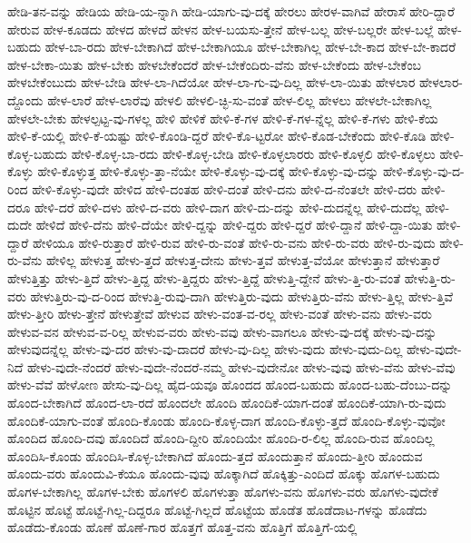 {ಹೇಡಿ-ತನ-ವನ್ನು
ಹೇಡಿಯ
ಹೇಡಿ-ಯ-ನ್ನಾಗಿ
ಹೇಡಿ-ಯಾಗು-ವು-ದಕ್ಕೆ
ಹೇರಲು
ಹೇರಳ-ವಾಗಿವೆ
ಹೇರಾಸೆ
ಹೇರಿ-ದ್ದಾರೆ
ಹೇರುವ
ಹೇಳ-ಕೂಡದು
ಹೇಳದ
ಹೇಳದೆ
ಹೇಳನ
ಹೇಳ-ಬಯಸು-ತ್ತೇನೆ
ಹೇಳ-ಬಲ್ಲ
ಹೇಳ-ಬಲ್ಲರೇ
ಹೇಳ-ಬಲ್ಲೆ
ಹೇಳ-ಬಹುದು
ಹೇಳ-ಬಾ-ರದು
ಹೇಳ-ಬೇಕಾಗಿದೆ
ಹೇಳ-ಬೇಕಾಗಿಯೂ
ಹೇಳ-ಬೇಕಾಗಿಲ್ಲ
ಹೇಳ-ಬೇ-ಕಾದ
ಹೇಳ-ಬೇ-ಕಾದರೆ
ಹೇಳ-ಬೇಕಾ-ಯಿತು
ಹೇಳ-ಬೇಕು
ಹೇಳಬೇಕೆಂದರೆ
ಹೇಳ-ಬೇಕೆಂದಿರು-ವೆನು
ಹೇಳ-ಬೇಕೆಂದು
ಹೇಳ-ಬೇಕೆಂಬ
ಹೇಳಬೇಕೆಂಬುದು
ಹೇಳ-ಬೇಡಿ
ಹೇಳ-ಲಾ-ಗಿದೆಯೋ
ಹೇಳ-ಲಾ-ಗು-ವು-ದಿಲ್ಲ
ಹೇಳ-ಲಾ-ಯಿತು
ಹೇಳಲಾರ
ಹೇಳಲಾರ-ದ್ದೊಂದು
ಹೇಳ-ಲಾರೆ
ಹೇಳ-ಲಾರೆವು
ಹೇಳಲಿ
ಹೇಳಲಿ-ಚ್ಛಿ-ಸು-ವಂತೆ
ಹೇಳ-ಲಿಲ್ಲ
ಹೇಳಲು
ಹೇಳಲೇ-ಬೇಕಾಗಿಲ್ಲ
ಹೇಳಲೇ-ಬೇಕು
ಹೇಳಲ್ಪಟ್ಟ-ವು-ಗಳಲ್ಲ
ಹೇಳಿ
ಹೇಳಿಕೆ
ಹೇಳಿ-ಕೆ-ಗಳ
ಹೇಳಿ-ಕೆ-ಗಳ-ನ್ನೆಲ್ಲ
ಹೇಳಿ-ಕೆ-ಗಳು
ಹೇಳಿ-ಕೆಯ
ಹೇಳಿ-ಕೆ-ಯಲ್ಲಿ
ಹೇಳಿ-ಕೆ-ಯಷ್ಟು
ಹೇಳಿ-ಕೊಂಡಿ-ದ್ದರೆ
ಹೇಳಿ-ಕೊ-ಟ್ಟರೋ
ಹೇಳಿ-ಕೊಡ-ಬೇಕೆಂದು
ಹೇಳಿ-ಕೊಡಿ
ಹೇಳಿ-ಕೊಳ್ಳ-ಬಹುದು
ಹೇಳಿ-ಕೊಳ್ಳ-ಬಾ-ರದು
ಹೇಳಿ-ಕೊಳ್ಳ-ಬೇಡಿ
ಹೇಳಿ-ಕೊಳ್ಳಲಾರರು
ಹೇಳಿ-ಕೊಳ್ಳಲಿ
ಹೇಳಿ-ಕೊಳ್ಳಲು
ಹೇಳಿ-ಕೊಳ್ಳು
ಹೇಳಿ-ಕೊಳ್ಳುತ್ತ
ಹೇಳಿ-ಕೊಳ್ಳು-ತ್ತಾ-ನೆಯೇ
ಹೇಳಿ-ಕೊಳ್ಳು-ವು-ದಕ್ಕೆ
ಹೇಳಿ-ಕೊಳ್ಳು-ವು-ದನ್ನು
ಹೇಳಿ-ಕೊಳ್ಳು-ವು-ದ-ರಿಂದ
ಹೇಳಿ-ಕೊಳ್ಳು-ವುದೇ
ಹೇಳಿದ
ಹೇಳಿ-ದಂತಹ
ಹೇಳಿ-ದಂತೆ
ಹೇಳಿ-ದನು
ಹೇಳಿ-ದ-ನೆಂತಲೇ
ಹೇಳಿ-ದರು
ಹೇಳಿ-ದರೂ
ಹೇಳಿ-ದರೆ
ಹೇಳಿ-ದಳು
ಹೇಳಿ-ದ-ವರು
ಹೇಳಿ-ದಾಗ
ಹೇಳಿ-ದು-ದನ್ನು
ಹೇಳಿ-ದುದನ್ನೆಲ್ಲ
ಹೇಳಿ-ದುದೆಲ್ಲ
ಹೇಳಿ-ದುದೇ
ಹೇಳಿದೆ
ಹೇಳಿ-ದೆನು
ಹೇಳಿ-ದೆಯೇ
ಹೇಳಿ-ದ್ದನ್ನು
ಹೇಳಿ-ದ್ದರು
ಹೇಳಿ-ದ್ದರೆ
ಹೇಳಿ-ದ್ದಾನೆ
ಹೇಳಿ-ದ್ದಾ-ಯಿತು
ಹೇಳಿ-ದ್ದಾರೆ
ಹೇಳಿಯೂ
ಹೇಳಿ-ರುತ್ತಾರೆ
ಹೇಳಿ-ರುವ
ಹೇಳಿ-ರು-ವಂತೆ
ಹೇಳಿ-ರು-ವನು
ಹೇಳಿ-ರು-ವರು
ಹೇಳಿ-ರು-ವುದು
ಹೇಳಿ-ರು-ವೆನು
ಹೇಳಿಲ್ಲ
ಹೇಳುತ್ತ
ಹೇಳು-ತ್ತದೆ
ಹೇಳುತ್ತ-ದೇನು
ಹೇಳು-ತ್ತವೆ
ಹೇಳುತ್ತ-ವೆಯೋ
ಹೇಳುತ್ತಾನೆ
ಹೇಳುತ್ತಾರೆ
ಹೇಳುತ್ತಿತ್ತು
ಹೇಳು-ತ್ತಿದೆ
ಹೇಳು-ತ್ತಿದ್ದ
ಹೇಳು-ತ್ತಿದ್ದರು
ಹೇಳು-ತ್ತಿದ್ದೆ
ಹೇಳುತ್ತಿ-ದ್ದೇನೆ
ಹೇಳು-ತ್ತಿ-ರು-ವಂತೆ
ಹೇಳುತ್ತಿ-ರು-ವರು
ಹೇಳುತ್ತಿರು-ವು-ದ-ರಿಂದ
ಹೇಳುತ್ತಿ-ರುವು-ದಾಗಿ
ಹೇಳುತ್ತಿರು-ವುದು
ಹೇಳುತ್ತಿರು-ವೆನು
ಹೇಳು-ತ್ತಿಲ್ಲ
ಹೇಳು-ತ್ತಿವೆ
ಹೇಳು-ತ್ತೀರಿ
ಹೇಳು-ತ್ತೇನೆ
ಹೇಳುತ್ತೇವೆ
ಹೇಳುವ
ಹೇಳು-ವಂತ-ವ-ರಲ್ಲ
ಹೇಳು-ವಂತೆ
ಹೇಳು-ವನು
ಹೇಳು-ವರು
ಹೇಳುವ-ವನ
ಹೇಳುವ-ವ-ರಿಲ್ಲ
ಹೇಳುವ-ವರು
ಹೇಳು-ವವು
ಹೇಳು-ವಾಗಲೂ
ಹೇಳು-ವು-ದಕ್ಕೆ
ಹೇಳು-ವು-ದನ್ನು
ಹೇಳುವುದನ್ನೆಲ್ಲ
ಹೇಳು-ವು-ದರ
ಹೇಳು-ವು-ದಾದರೆ
ಹೇಳು-ವು-ದಿಲ್ಲ
ಹೇಳು-ವುದು
ಹೇಳು-ವುದು-ದಿಲ್ಲ
ಹೇಳು-ವುದೇ-ನಿದೆ
ಹೇಳು-ವುದೇ-ನೆಂದರೆ
ಹೇಳು-ವುದೇ-ನೆಂದರೆ-ನಮ್ಮ
ಹೇಳು-ವುದೇನೋ
ಹೇಳು-ವುವು
ಹೇಳು-ವೆನು
ಹೇಳು-ವೆವು
ಹೇಳು-ವೆವೆ
ಹೇಳೋಣ
ಹೇಸು-ವು-ದಿಲ್ಲ
ಹೈದ-ಯವೂ
ಹೊಂದದ
ಹೊಂದ-ಬಹುದು
ಹೊಂದ-ಬಹು-ದೆಂಬು-ದನ್ನು
ಹೊಂದ-ಬೇಕಾಗಿದೆ
ಹೊಂದ-ಲಾ-ರದೆ
ಹೊಂದಲೇ
ಹೊಂದಿ
ಹೊಂದಿಕೆ-ಯಾಗ-ದಂತೆ
ಹೊಂದಿಕೆ-ಯಾಗಿ-ರು-ವುದು
ಹೊಂದಿಕೆ-ಯಾಗು-ವಂತೆ
ಹೊಂದಿ-ಕೊಂಡು
ಹೊಂದಿ-ಕೊಳ್ಳ-ದಾಗ
ಹೊಂದಿ-ಕೊಳ್ಳು-ತ್ತದೆ
ಹೊಂದಿ-ಕೊಳ್ಳು-ವುವೋ
ಹೊಂದಿದ
ಹೊಂದಿ-ದವು
ಹೊಂದಿದೆ
ಹೊಂದಿ-ದ್ದೀರಿ
ಹೊಂದಿಯೇ
ಹೊಂದಿ-ರ-ಲಿಲ್ಲ
ಹೊಂದಿ-ರುವ
ಹೊಂದಿಲ್ಲ
ಹೊಂದಿಸಿ-ಕೊಂಡು
ಹೊಂದಿಸಿ-ಕೊಳ್ಳ-ಬೇಕಾಗಿದೆ
ಹೊಂದು-ತ್ತದೆ
ಹೊಂದುತ್ತಾನೆ
ಹೊಂದು-ತ್ತೀರಿ
ಹೊಂದುವ
ಹೊಂದು-ವರು
ಹೊಂದುವಿ-ಕೆಯೂ
ಹೊಂದು-ವುವು
ಹೊಕ್ಕಾಗಿದೆ
ಹೊಕ್ಕಿತ್ತು-ಎಂದಿದೆ
ಹೊಕ್ಕು
ಹೊಗಳ-ಬಹುದು
ಹೊಗಳ-ಬೇಕಾಗಿಲ್ಲ
ಹೊಗಳ-ಬೇಕು
ಹೊಗಳಲಿ
ಹೊಗಳುತ್ತಾ
ಹೊಗಳು-ವನು
ಹೊಗಳು-ವರು
ಹೊಗಳು-ವುದೇಕೆ
ಹೊಟ್ಟಿನ
ಹೊಟ್ಟೆ
ಹೊಟ್ಟೆ-ಗಿಲ್ಲ-ದಿದ್ದರೂ
ಹೊಟ್ಟೆ-ಗಿಲ್ಲದೆ
ಹೊಟ್ಟೆಯ
ಹೊಡೆತ
ಹೊಡೆದಾಟ-ಗಳನ್ನು
ಹೊಡೆದು
ಹೊಡೆದು-ಕೊಂಡು
ಹೊಣೆ
ಹೊಣೆ-ಗಾರ
ಹೊತ್ತಗೆ
ಹೊತ್ತ-ವನು
ಹೊತ್ತಿಗೆ
ಹೊತ್ತಿಗೆ-ಯಲ್ಲಿ
}
